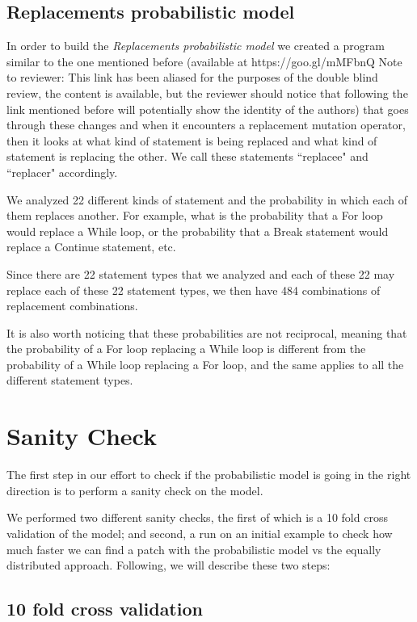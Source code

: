 \documentclass[conference]{IEEEtran}
\begin{document}
\subsection{Replacements probabilistic model}
In order to build the \textit{Replacements probabilistic model} we created a 
program similar to the one mentioned before (available at https://goo.gl/mMFbnQ
Note to reviewer: This link has been aliased for the purposes of the double 
blind review, the content is available, but the reviewer should notice that 
following the link mentioned before will potentially show the identity of the authors) that 
goes through these 
changes and when it encounters a  replacement mutation operator, then it looks 
at what kind of statement is being 
replaced and what kind of statement is replacing the other. We call these 
statements ``replacee" and ``replacer" accordingly.


We analyzed 22 different kinds of statement and the probability in which each of 
them replaces another. For example, what is the probability that a For loop 
would replace a While loop, or the probability that a Break statement would 
replace a Continue statement, etc.

Since there are 22 statement types that we analyzed and each of these 22 may 
replace each of these 22 statement types, we then have 484 combinations of 
replacement combinations. 

It is also worth noticing that these probabilities are not reciprocal, meaning 
that the probability of a For loop replacing a While loop is different from the 
probability of a While loop replacing a For loop, and the same applies to all 
the different statement types.


\section{Sanity Check}
The first step in our effort to check if the probabilistic model is going in the 
right direction is to perform a sanity check on the model.

We performed two different sanity checks, the first of which is a 10 fold cross 
validation of the model; and second, a run on an initial example to check how 
much faster we can find a patch with the probabilistic model vs the equally 
distributed approach. Following, we will describe these two steps:

\subsection{10 fold cross validation}
\end{document}
